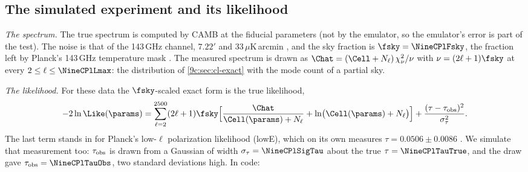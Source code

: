 \subsection{The simulated experiment and its likelihood}
\label{9c:sec:planck-setup}

\emph{The spectrum.} The true spectrum is computed by CAMB at the fiducial parameters (not by the emulator, so
the emulator's error is part of the test). The noise is that of the 143\,GHz channel, $7.22'$ and
$33\,\mu$K\,arcmin \cite{Planck2018I}, and the sky fraction is $\fsky=\NineCPlFsky$, the fraction left by Planck's
143\,GHz temperature mask \cite{Planck2018V}. The measured spectrum is drawn as
$\Chat=(\Cell+N_\ell)\,\chi^2_\nu/\nu$ with $\nu=(2\ell+1)\fsky$ at every $2\le\ell\le\NineCPlLmax$: the
distribution of \cref{9c:sec:cl-exact} with the mode count of a partial sky.

\emph{The likelihood.} For these data the $\fsky$-scaled exact form is the true likelihood,
\begin{equation}
  -2\ln\Like(\params)=\sum_{\ell=2}^{2500}(2\ell+1)\fsky\Bigl[\frac{\Chat}{\Cell(\params)+N_\ell}+\ln\bigl(\Cell(\params)+N_\ell\bigr)\Bigr]
  +\frac{(\tau-\tau_{\rm obs})^2}{\sigma_\tau^2}.
  \label{9c:eq:planck-like}
\end{equation}
The last term stands in for Planck's low-$\ell$ polarization likelihood (lowE), which on its own measures
$\tau=0.0506\pm0.0086$ \cite{Planck2018VI}. We simulate that measurement too: $\tau_{\rm obs}$ is drawn from a
Gaussian of width $\sigma_\tau=\NineCPlSigTau$ about the true $\tau=\NineCPlTauTrue$, and the draw gave
$\tau_{\rm obs}=\NineCPlTauObs$, two standard deviations high. In code:

